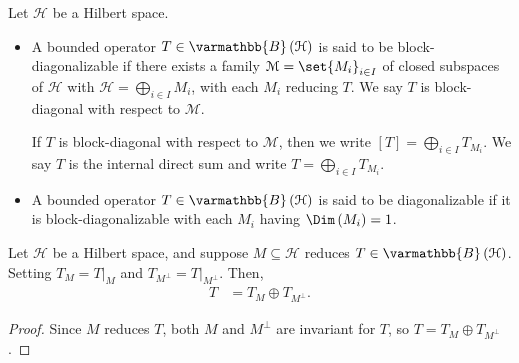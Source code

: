 \documentclass[10pt]{mypackage}
\renewcommand*{\mathbb}[1]{\varmathbb{#1}}
\newcommand{\B}{\mathbb{B}}
\begin{document}
\begin{definition}
  Let $\mathcal{H}$ be a Hilbert space.
  \begin{itemize}
    \item A bounded operator $T\in \B\left(\mathcal{H}\right)$ is said to be block-diagonalizable if there exists a family $\mathcal{M} = \set{M_i}_{i\in I}$ of closed subspaces of $\mathcal{H}$ with $\mathcal{H} = \bigoplus_{i\in I}M_i$, with each $M_i$ reducing $T$. We say $T$ is block-diagonal with respect to $\mathcal{M}$.\newline

      If $T$ is block-diagonal with respect to $\mathcal{M}$, then we write $\left[T\right] = \bigoplus_{i\in I}T_{M_i}$. We say $T$ is the internal direct sum and write $T = \bigoplus_{i\in I}T_{M_i}$.
    \item A bounded operator $T\in \B\left(\mathcal{H}\right)$ is said to be diagonalizable if it is block-diagonalizable with each $M_i$ having $\Dim\left(M_i\right) = 1$.
  \end{itemize}
\end{definition}
\begin{proposition}
  Let $\mathcal{H}$ be a Hilbert space, and suppose $M\subseteq \mathcal{H}$ reduces $T\in \B\left(\mathcal{H}\right)$. Setting $T_M = T|_{M}$ and $T_{M^{\perp}} = T|_{M^{\perp}}$. Then,
  \begin{align*}
    T &= T_{M}\oplus T_{M^{\perp}}.
  \end{align*}
\end{proposition}
\begin{proof}
  Since $M$ reduces $T$, both $M$ and $M^{\perp}$ are invariant for $T$, so $T = T_{M} \oplus T_{M^{\perp}}$.
\end{proof}
\end{document}
